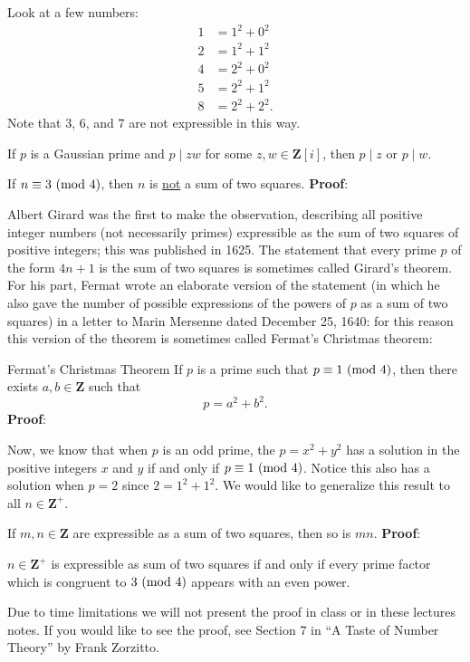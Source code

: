 Look at a few numbers:
\begin{align*}
    1 & =1^2+0^2  \\
    2 & =1^2+1^2  \\
    4 & =2^2+0^2  \\
    5 & =2^2+1^2  \\
    8 & =2^2+2^2.
\end{align*}
Note that $ 3 $, $ 6 $, and $ 7 $ are not expressible in this way.

\begin{Proposition}{}{}
    If $ p $ is a Gaussian prime and $ p\mid zw $ for some $ z,w\in\mathbf{Z}[i] $, then
    $ p\mid z $ or $ p\mid w $.
\end{Proposition}
\begin{Theorem}{}{}
    If $ n\equiv 3\ (\mathrm{mod}\ 4) $, then $ n $ is \underline{not} a sum of two squares.
    \tcblower{}
    \textbf{Proof}:
\end{Theorem}
Albert Girard was the first to make the observation, describing all positive
integer numbers (not necessarily primes) expressible as the sum of two squares of
positive integers; this was published in 1625. The statement that every prime $p$ of
the form $4n+1$ is the sum of two squares is sometimes called Girard's theorem. For
his part, Fermat wrote an elaborate version of the statement (in which he also gave
the number of possible expressions of the powers of $p$ as a sum of two squares) in a
letter to Marin Mersenne dated December 25, 1640: for this reason this version of
the theorem is sometimes called Fermat's Christmas theorem:
\begin{Theorem}{Fermat's Christmas Theorem}{}
    If $ p $ is a prime such that $ p\equiv 1\ (\mathrm{mod}\ 4) $, then there exists $ a,b\in\mathbf{Z} $ such that
    \[ p=a^2+b^2. \]
    \tcblower{}
    \textbf{Proof}:
\end{Theorem}
Now, we know that when $ p $ is an odd prime, the $ p=x^2+y^2 $ has a solution in the positive integers $ x $ and $ y $ if
and only if $ p\equiv 1\ (\mathrm{mod}\ 4) $. Notice this also has a solution when $ p=2 $
since $ 2=1^2+1^2 $. We would like to generalize this result to all $ n\in\mathbf{Z}^+ $.
\begin{Proposition}{}{}
    If $ m,n\in\mathbf{Z} $ are expressible as a sum of two squares, then so is $ mn $.
    \tcblower{}
    \textbf{Proof}:
\end{Proposition}
\begin{Theorem}{}{}
    $ n\in\mathbf{Z}^+ $ is expressible as sum of two squares
    if and only if every prime factor which is congruent to $ 3\ (\mathrm{mod}\ 4) $
    appears with an even power.
\end{Theorem}
Due to time limitations we will not present the proof in class or in these lectures
notes. If you would like to see the proof, see Section 7 in ``A Taste of Number
Theory'' by Frank Zorzitto.

